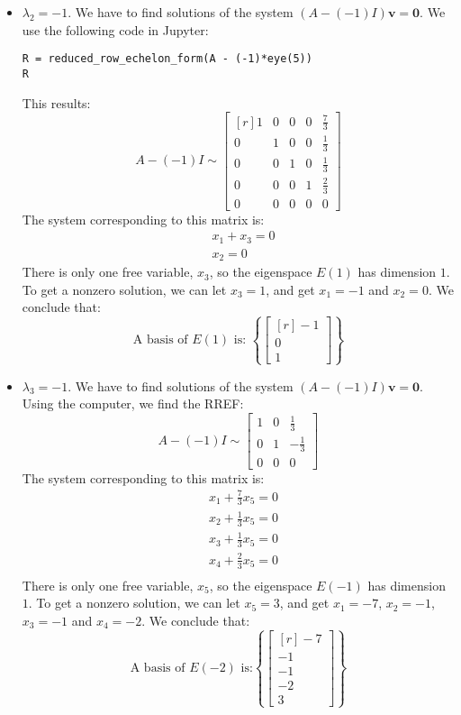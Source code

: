 \documentclass[12pt]{article}
\begin{document}
\begin{itemize}
\item $\lambda_2=-1$. We have to find solutions of the system $(A-(-1)I)\mathbf{v}=\mathbf{0}$. We use the following code in Jupyter:
\begin{lstlisting}
R = reduced_row_echelon_form(A - (-1)*eye(5))
R
\end{lstlisting}
This results:
\[
A-(-1)I\sim\left[\begin{matrix*}[r]1 & 0 & 0 & 0 & \frac{7}{3}\\0 & 1 & 0 & 0 & \frac{1}{3}\\0 & 0 & 1 & 0 & \frac{1}{3}\\0 & 0 & 0 & 1 & \frac{2}{3}\\0 & 0 & 0 & 0 & 0\end{matrix*}\right]
\]
The system corresponding to this matrix is:
\begin{align*}
&x_1+x_3=0\\
&x_2=0
\end{align*}
There is only one free variable, $x_3$, so the eigenspace $E(1)$ has dimension $1$.
To get a nonzero solution, we can let $x_3=1$, and get $x_1=-1$ and $x_2=0$. We conclude that:
\[
\text{A basis of $E(1)$ is: } \left\{\begin{bmatrix*}[r]-1\\0\\1\end{bmatrix*}\right\}
\]

\item $\lambda_3=-1$. We have to find solutions of the system $(A-(-1)I)\mathbf{v}=\mathbf{0}$. Using the computer, we find the RREF:
\[
A-(-1)I\sim\left[\begin{matrix}1 & 0 & \frac{1}{3}\\0 & 1 & - \frac{1}{3}\\0 & 0 & 0\end{matrix}\right]
\]
The system corresponding to this matrix is:
\begin{align*}
&x_1+\frac{7}{3}x_5=0\\
&x_2+\frac{1}{3}x_5=0\\
&x_3+\frac{1}{3}x_5=0\\
&x_4+\frac{2}{3}x_5=0\\
\end{align*}
There is only one free variable, $x_5$, so the eigenspace $E(-1)$ has dimension $1$.
To get a nonzero solution, we can let $x_5=3$, and get $x_1=-7$, $x_2=-1$, $x_3=-1$ and $x_4=-2$. We conclude that:
\[
\text{A basis of $E(-2)$ is:} \left\{\begin{bmatrix*}[r]-7\\-1\\-1\\-2\\3\end{bmatrix*}\right\}
\]
\end{itemize}
\end{document}
